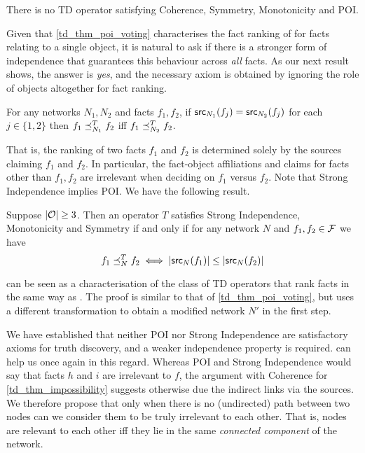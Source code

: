 \begin{theorem}
\label{td_thm_impossibility}
There is no TD operator satisfying Coherence, Symmetry, Monotonicity and POI.
\end{theorem}

Given that \cref{td_thm_poi_voting} characterises the fact ranking of
\voting{} for facts relating to a single object, it is natural to ask if there
is a stronger form of independence that guarantees this behaviour across
\emph{all} facts. As our next result shows, the answer is \emph{yes}, and the
necessary axiom is obtained by ignoring the role of objects altogether for fact
ranking.

\begin{axiom}
For any networks $N_1, N_2$ and facts $f_1, f_2$, if $\mathsf{src}_{N_1}(f_j) =
\mathsf{src}_{N_2}(f_j)$ for each $j \in \{1, 2\}$ then $f_1 \preceq_{N_1}^T f_2$ iff
$f_1 \preceq_{N_2}^T f_2$.
\end{axiom}

That is, the ranking of two facts $f_1$ and $f_2$ is determined solely by the
sources claiming $f_1$ and $f_2$. In particular, the fact-object affiliations
and claims for facts other than $f_1, f_2$ are irrelevant when deciding on
$f_1$ versus $f_2$. Note that Strong Independence implies POI.
%
We have the following result.

\begin{theorem}
\label{td_thm_voting_characterisation}
Suppose $|\mathcal{O}| \ge 3$. Then an operator $T$ satisfies Strong Independence,
Monotonicity and Symmetry if and only if for any network $N$ and $f_1, f_2 \in
\mathcal{F}$ we have
\[
    f_1 \preceq_N^T f_2 \iff |\mathsf{src}_N(f_1)| \le |\mathsf{src}_N(f_2)|
\]
\end{theorem}

 can be seen as a characterisation of the
class of TD operators that rank facts in the same way as \voting{}. The proof
is similar to that of \cref{td_thm_poi_voting}, but uses a different
transformation to obtain a modified network $N'$ in the first step.

We have established that neither POI nor Strong Independence are satisfactory
axioms for truth discovery, and a weaker independence property is required.
 can help us once again in this regard. Whereas POI and
Strong Independence would say that facts $h$ and $i$ are irrelevant to $f$, the
argument with Coherence for \cref{td_thm_impossibility} suggests otherwise due the
indirect links via the sources. We therefore propose that only when there is no
(undirected) path between two nodes can we consider them to be truly irrelevant
to each other. That is, nodes are relevant to each other iff they lie in the
same \emph{connected component} of the network.

